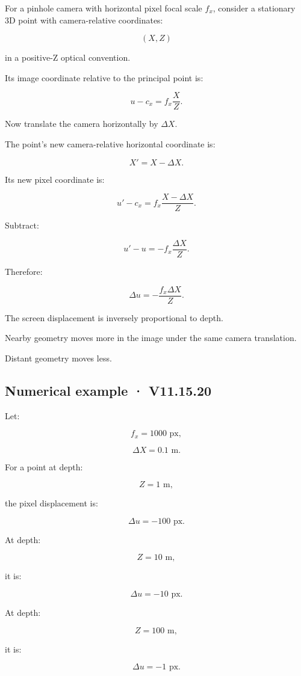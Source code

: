 For a pinhole camera with horizontal pixel focal scale \(f_x\), consider a stationary 3D point with camera-relative coordinates:

\[ (X,Z) \]

in a positive-Z optical convention.

Its image coordinate relative to the principal point is:

\[ u-c_x=f_x\frac XZ. \]

Now translate the camera horizontally by \(\Delta X\).

The point's new camera-relative horizontal coordinate is:

\[ X'=X-\Delta X. \]

Its new pixel coordinate is:

\[ u'-c_x=f_x\frac{X-\Delta X}{Z}. \]

Subtract:

\[ u'-u=-f_x\frac{\Delta X}{Z}. \]

Therefore:

\[ \boxed{ \Delta u=-\frac{f_x\Delta X}{Z}. } \]

The screen displacement is inversely proportional to depth.

Nearby geometry moves more in the image under the same camera translation.

Distant geometry moves less.

\subsection{Numerical example · V11.15.20}\label{02-foundations-ii-ch035-numerical-example-v11.15.20}

Let:

\[ f_x=1000\text{ px}, \]

\[ \Delta X=0.1\text{ m}. \]

For a point at depth:

\[ Z=1\text{ m}, \]

the pixel displacement is:

\[ \boxed{\Delta u=-100\text{ px}}. \]

At depth:

\[ Z=10\text{ m}, \]

it is:

\[ \boxed{\Delta u=-10\text{ px}}. \]

At depth:

\[ Z=100\text{ m}, \]

it is:

\[ \boxed{\Delta u=-1\text{ px}}. \]

